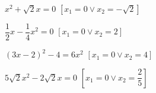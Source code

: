 \begin{esercizio}[\Ast]
\begin{multicols}{2}
\begin{enumeratea}
 \item~\(x^{2} + \sqrt{2} x = 0\) 
  \hfill\(\left[x_{1} = 0 \vee x_{2} = - \sqrt{2}\right]\)
 \item~\(\dfrac{1}{2} x - \dfrac{1}{4} x^{2} = 0\) 
  \hfill\(\left[x_{1} = 0 \vee x_{2} = 2\right]\)
 \item~\((3 x - 2)^{2} - 4 = 6 x^{2}\)
  \hfill\(\left[x_{1} = 0 \vee x_{2} = 4\right]\)
 \item~\(5 \sqrt{2} x^{2} - 2 \sqrt{2} x = 0\) 
  \hfill\(\left[x_{1} = 0 \vee x_{2} = \dfrac{2}{5}\right]\)
 \end{enumeratea}
 \end{multicols}
\end{esercizio}

% 
